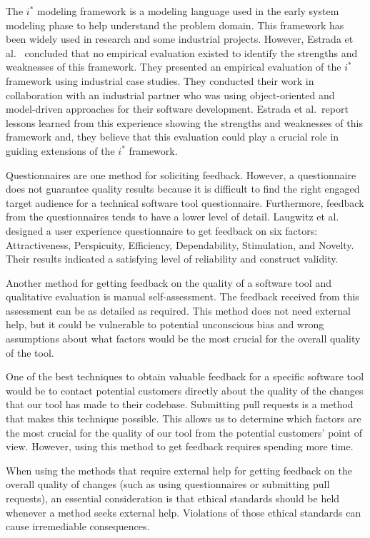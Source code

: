 The $i^*$ modeling framework is a modeling language used in the early system modeling phase to help understand the problem domain. This framework has been widely used in research and some industrial projects. However, Estrada et al.~\cite{ee_framework} concluded that no empirical evaluation existed to identify the strengths and weaknesses of this framework. They presented an empirical evaluation of the $i^*$ framework using industrial case studies. They conducted their work in collaboration with an industrial partner who was using object-oriented and model-driven approaches for their software development. Estrada et al.\ report lessons learned from this experience showing the strengths and weaknesses of this framework and, they believe that this evaluation could play a crucial role in guiding extensions of the $i^*$ framework.

Questionnaires are one method for soliciting feedback. However, a questionnaire does not guarantee quality results because it is difficult to find the right engaged target audience for a technical software tool questionnaire. Furthermore, feedback from the questionnaires tends to have a lower level of detail.
Laugwitz et al.~\cite{laugwitz2008construction} designed a user experience questionnaire to get feedback on six factors: Attractiveness, Perspicuity, Efficiency, Dependability, Stimulation, and Novelty. Their results indicated a satisfying level of reliability and construct validity.

Another method for getting feedback on the quality of a software tool and qualitative evaluation is manual self-assessment. The feedback received from this assessment can be as detailed as required. This method does not need external help, but it could be vulnerable to potential unconscious bias and wrong assumptions about what factors would be the most crucial for the overall quality of the tool.

One of the best techniques to obtain valuable feedback for a specific software tool would be to contact potential customers directly about the quality of the changes that our tool has made to their codebase. Submitting pull requests is a method that makes this technique possible. This allows us to determine which factors are the most crucial for the quality of our tool from the potential customers' point of view. However, using this method to get feedback requires spending more time.

When using the methods that require external help for getting feedback on the overall quality of changes (such as using questionnaires or submitting pull requests), an essential consideration is that ethical standards should be held whenever a method seeks external help. Violations of those ethical standards can cause irremediable consequences.

